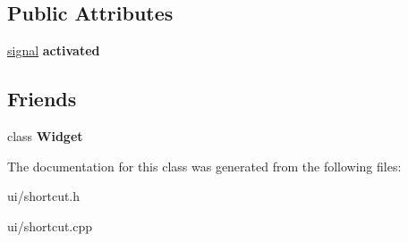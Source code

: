 \subsection*{Public Attributes}
\begin{DoxyCompactItemize}
\item 
\hypertarget{class_tempest_1_1_shortcut_a5e585b6061be1f6e52b90731ae384105}{\hyperlink{class_tempest_1_1signal}{signal} {\bfseries activated}}\label{class_tempest_1_1_shortcut_a5e585b6061be1f6e52b90731ae384105}

\end{DoxyCompactItemize}
\subsection*{Friends}
\begin{DoxyCompactItemize}
\item 
\hypertarget{class_tempest_1_1_shortcut_a29fa75ce3911bef8c5f4414f6f0242b8}{class {\bfseries Widget}}\label{class_tempest_1_1_shortcut_a29fa75ce3911bef8c5f4414f6f0242b8}

\end{DoxyCompactItemize}


The documentation for this class was generated from the following files\+:\begin{DoxyCompactItemize}
\item 
ui/shortcut.\+h\item 
ui/shortcut.\+cpp\end{DoxyCompactItemize}

